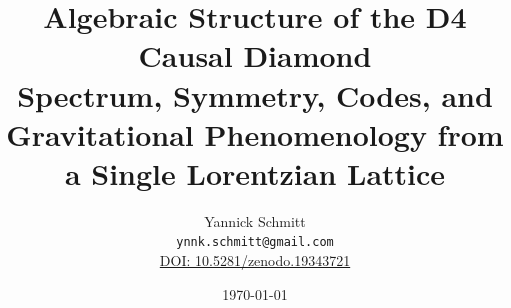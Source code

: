 \documentclass[12pt,a4paper]{article}
\theoremstyle{plain}
\theoremstyle{definition}
\begin{document}
\title{%
  \textbf{Algebraic Structure of the D4 Causal Diamond}\\[6pt]
  \large Spectrum, Symmetry, Codes, and Gravitational Phenomenology
  from a Single Lorentzian Lattice
}
\author{Yannick Schmitt \\ 
\texttt{ynnk.schmitt@gmail.com} \\
\vspace{4pt} 
\href{https://doi.org/10.5281/zenodo.19343721}{DOI: 10.5281/zenodo.19343721}}
\date{\today}
\maketitle

\end{document}
